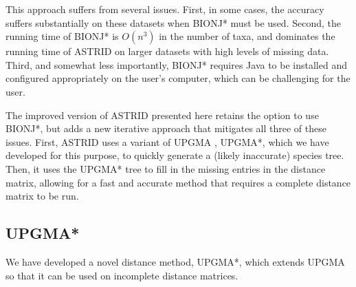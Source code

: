 This approach suffers from several issues. First, in some cases, the accuracy suffers substantially on these datasets when BIONJ* must be used. Second, the running time of BIONJ* is $O(n^3)$ in the number of taxa, and dominates the running time of ASTRID on larger datasets with high levels of missing data. Third, and somewhat less importantly, BIONJ* requires Java to be installed and configured appropriately on the user's computer, which can be challenging for the user. 

The improved version of ASTRID presented here retains the option to use BIONJ*, but adds a new iterative approach that mitigates all three of these issues. First, ASTRID uses a variant of UPGMA \cite{sokal1958statistical}, UPGMA*, which we have developed for this purpose, to quickly generate a (likely inaccurate) species tree. Then, it uses the UPGMA* tree to fill in the missing entries in the distance matrix, allowing for a fast and accurate method that requires a complete distance matrix to be run.


\subsection{UPGMA*}

We have developed a novel distance method, UPGMA*, which extends UPGMA so that it can be used on incomplete distance matrices. 

